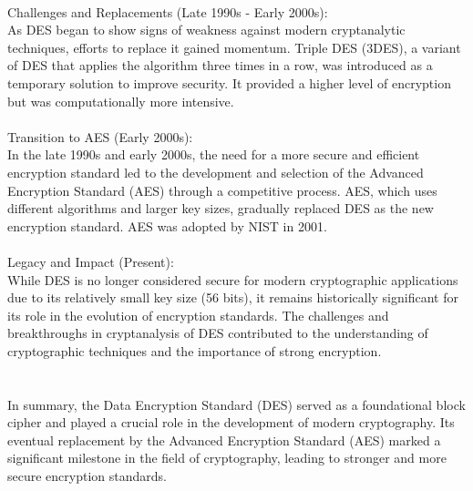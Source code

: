 \documentclass{report}
\begin{document}
\\
Challenges and Replacements (Late 1990s - Early 2000s):\\
As DES began to show signs of weakness against modern cryptanalytic techniques, efforts to replace it gained momentum.
Triple DES (3DES), a variant of DES that applies the algorithm three times in a row, was introduced as a temporary solution to improve security. It provided a higher level of encryption but was computationally more intensive.\\
\\
Transition to AES (Early 2000s):\\
In the late 1990s and early 2000s, the need for a more secure and efficient encryption standard led to the development and selection of the Advanced Encryption Standard (AES) through a competitive process.
AES, which uses different algorithms and larger key sizes, gradually replaced DES as the new encryption standard. AES was adopted by NIST in 2001.\\
\\
Legacy and Impact (Present):\\
While DES is no longer considered secure for modern cryptographic applications due to its relatively small key size (56 bits), it remains historically significant for its role in the evolution of encryption standards.
The challenges and breakthroughs in cryptanalysis of DES contributed to the understanding of cryptographic techniques and the importance of strong encryption.\\
\\
\\
In summary, the Data Encryption Standard (DES) served as a foundational block cipher and played a crucial role in the development of modern cryptography. Its eventual replacement by the Advanced Encryption Standard (AES) marked a significant milestone in the field of cryptography, leading to stronger and more secure encryption standards.
\end{document}
